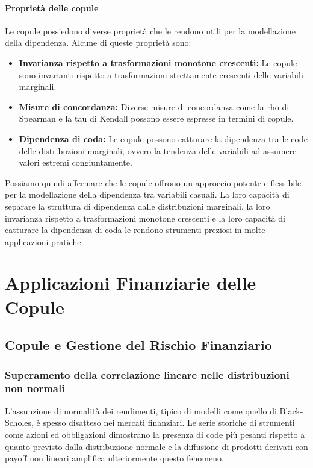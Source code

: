 \documentclass[%
	corpo=11pt,
    twoside,
    stile=classica,
    oldstyle,
    tipotesi=custom,
    greek,
    evenboxes,
]{toptesi}
\begin{document}
\subsection{Proprietà delle copule}
Le copule possiedono diverse proprietà che le rendono utili per la modellazione della dipendenza. Alcune di queste proprietà sono:

\begin{itemize}
	\item \textbf{Invarianza rispetto a trasformazioni monotone crescenti:}  
	Le copule sono invarianti rispetto a trasformazioni strettamente crescenti delle variabili marginali.
	
	\item \textbf{Misure di concordanza:}  
	Diverse misure di concordanza come la rho di Spearman e la tau di Kendall possono essere espresse in termini di copule.
	
	\item \textbf{Dipendenza di coda:}  
	Le copule possono catturare la dipendenza tra le code delle distribuzioni marginali, ovvero la tendenza delle variabili ad assumere valori estremi congiuntamente.
\end{itemize}

Possiamo quindi affermare che le copule offrono un approccio potente e flessibile per la modellazione della dipendenza tra variabili casuali. La loro capacità di separare la struttura di dipendenza dalle distribuzioni marginali, la loro invarianza rispetto a trasformazioni monotone crescenti e la loro capacità di catturare la dipendenza di coda le rendono strumenti preziosi in molte applicazioni pratiche.




\part{Applicazioni Finanziarie delle Copule}

\chapter{Copule e Gestione del Rischio Finanziario}

\section{Superamento della correlazione lineare nelle distribuzioni non normali}

L'assunzione di normalità dei rendimenti, tipico di modelli come quello di Black-Scholes, è spesso disatteso nei mercati finanziari. Le serie storiche di strumenti come azioni ed obbligazioni dimostrano la presenza di code più pesanti rispetto a quanto previsto dalla distribuzione normale e la diffusione di prodotti derivati con payoff non lineari amplifica ulteriormente questo fenomeno.
\end{document}
